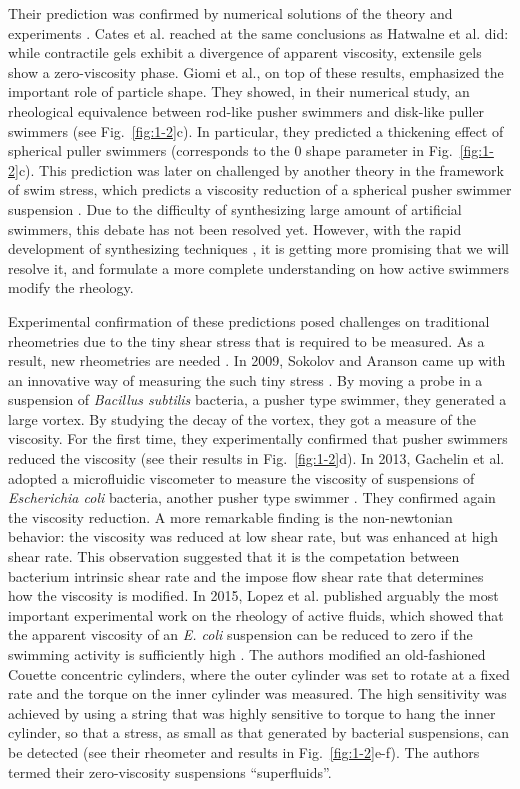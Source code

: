 Their prediction was confirmed by numerical solutions of the theory \cite{Cates2008, Giomi2010} and experiments \cite{Sokolov2009, Gachelin2013, Lopez2015}. Cates et al. reached at the same conclusions as Hatwalne et al. did: while contractile gels exhibit a divergence of apparent viscosity, extensile gels show a zero-viscosity phase. Giomi et al., on top of these results, emphasized the important role of particle shape. They showed, in their numerical study, an rheological equivalence between rod-like pusher swimmers and disk-like puller swimmers (see Fig.~\ref{fig:1-2}c). In particular, they predicted a thickening effect of spherical puller swimmers (corresponds to the 0 shape parameter in Fig.~\ref{fig:1-2}c). This prediction was later on challenged by another theory in the framework of swim stress, which predicts a viscosity reduction of a spherical pusher swimmer suspension
\cite{Takatori2017}. Due to the difficulty of synthesizing large amount of artificial swimmers, this debate has not been resolved yet. However, with the rapid development of synthesizing techniques \cite{Palacci2013, Bricard2013}, it is getting more promising that we will resolve it, and formulate a more complete understanding on how active swimmers modify the rheology.

Experimental confirmation of these predictions posed challenges on traditional rheometries due to the tiny shear stress that is required to be measured. As a result, new rheometries are needed \cite{Marchetti2015}. In 2009, Sokolov and Aranson came up with an innovative way of measuring the such tiny stress \cite{Sokolov2009}. By moving a probe in a suspension of \textit{Bacillus subtilis} bacteria, a pusher type swimmer, they generated a large vortex. By studying the decay of the vortex, they got a measure of the viscosity. For the first time, they experimentally confirmed that pusher swimmers reduced the viscosity (see their results in Fig.~\ref{fig:1-2}d). In 2013, Gachelin et al. adopted a microfluidic viscometer to measure the viscosity of suspensions of \textit{Escherichia coli} bacteria, another pusher type swimmer \cite{Gachelin2013}. They confirmed again the viscosity reduction. A more remarkable finding is the non-newtonian behavior: the viscosity was reduced at low shear rate, but was enhanced at high shear rate. This observation suggested that it is the competation between bacterium intrinsic shear rate and the impose flow shear rate that determines how the viscosity is modified. In 2015, Lopez et al. published arguably the most important experimental work on the rheology of active fluids, which showed that the apparent viscosity of an \textit{E. coli} suspension can be reduced to zero if the swimming activity is sufficiently high \cite{Lopez2015}. The authors modified an old-fashioned Couette concentric cylinders, where the outer cylinder was set to rotate at a fixed rate and the torque on the inner cylinder was measured. The high sensitivity was achieved by using a string that was highly sensitive to torque to hang the inner cylinder, so that a stress, as small as that generated by bacterial suspensions, can be detected (see their rheometer and results in Fig.~\ref{fig:1-2}e-f). The authors termed their zero-viscosity suspensions ``superfluids''.

